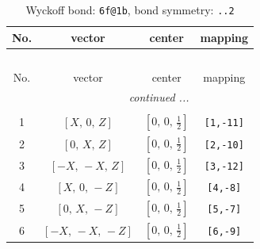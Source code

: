 \documentclass[fleqn,8pt]{jsarticle}
\begin{document}
\begin{longtable}{cccc}
\caption{Wyckoff bond: {\tt 6f@1b}, bond symmetry: {\tt ..2}}
 \\
 \hline \hline
No. & vector & center & mapping \\ \hline \endfirsthead

\multicolumn{3}{l}{\tablename\ \thetable{}} \\
 \hline \hline
No. & vector & center & mapping \\ \hline \endhead

 \hline \hline
\multicolumn{3}{r}{\footnotesize\it continued ...} \\ \endfoot

 \hline \hline
\multicolumn{3}{r}{} \\ \endlastfoot

1 & $\left[ X,\, 0,\, Z \right]$ & $\left[ 0,\, 0,\, \frac{1}{2} \right]$ & {\tt [1,-11]} \\ \hline
2 & $\left[ 0,\, X,\, Z \right]$ & $\left[ 0,\, 0,\, \frac{1}{2} \right]$ & {\tt [2,-10]} \\ \hline
3 & $\left[ - X,\, - X,\, Z \right]$ & $\left[ 0,\, 0,\, \frac{1}{2} \right]$ & {\tt [3,-12]} \\ \hline
4 & $\left[ X,\, 0,\, - Z \right]$ & $\left[ 0,\, 0,\, \frac{1}{2} \right]$ & {\tt [4,-8]} \\ \hline
5 & $\left[ 0,\, X,\, - Z \right]$ & $\left[ 0,\, 0,\, \frac{1}{2} \right]$ & {\tt [5,-7]} \\ \hline
6 & $\left[ - X,\, - X,\, - Z \right]$ & $\left[ 0,\, 0,\, \frac{1}{2} \right]$ & {\tt [6,-9]} \\
\end{longtable}
\renewcommand{\arraystretch}{1.2}
\end{document}
